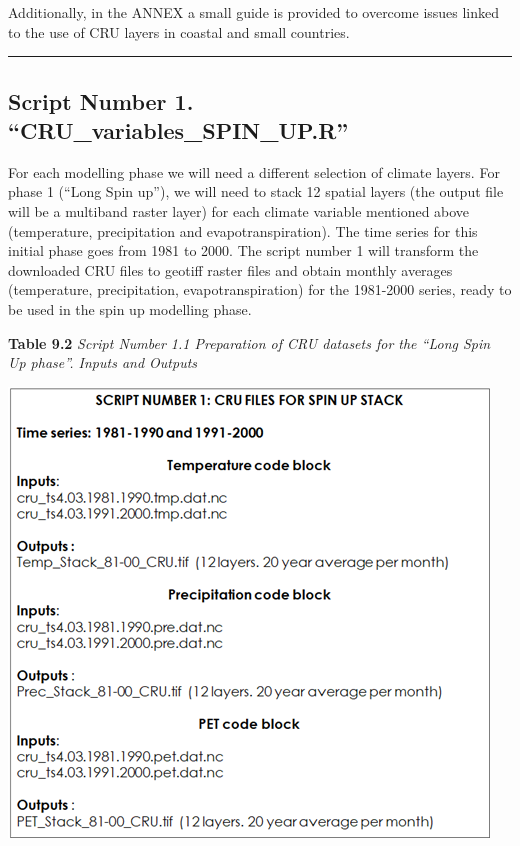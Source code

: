 \documentclass[
  10pt,
  b5paper,
]{book}
\begin{document}
Additionally, in the ANNEX a small guide is provided to overcome issues linked to the use of CRU layers in coastal and small countries.

\begin{center}\rule{0.5\linewidth}{0.5pt}\end{center}

\hypertarget{script-number-1.-cru_variables_spin_up.r}{%
\subsection{Script Number 1. ``CRU\_variables\_SPIN\_UP.R''}\label{script-number-1.-cru_variables_spin_up.r}}

For each modelling phase we will need a different selection of climate layers. For phase 1 (``Long Spin up''), we will need to stack 12 spatial layers (the output file will be a multiband raster layer) for each climate variable mentioned above (temperature, precipitation and evapotranspiration). The time series for this initial phase goes from 1981 to 2000. The script number 1 will transform the downloaded CRU files to geotiff raster files and obtain monthly averages (temperature, precipitation, evapotranspiration) for the 1981-2000 series, ready to be used in the spin up modelling phase.

\textbf{Table 9.2} \emph{Script Number 1.1 Preparation of CRU datasets for the ``Long Spin Up phase''. Inputs and Outputs}

\includegraphics{tables/Table_9.1.png}
\end{document}
